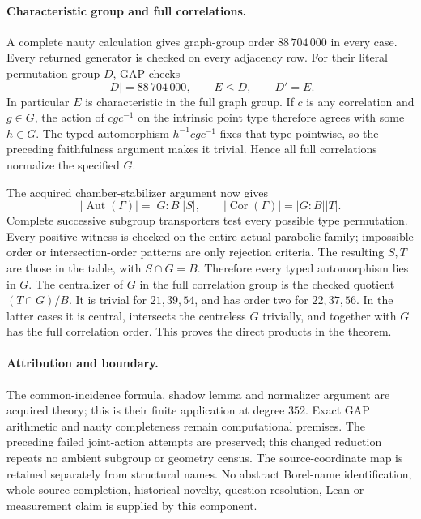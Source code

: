 \documentclass[11pt]{article}
\newcommand{\Aut}{\operatorname{Aut}}\newcommand{\Cor}{\operatorname{Cor}}
\begin{document}
\paragraph{Characteristic group and full correlations.}
A complete nauty calculation gives graph-group order $88\,704\,000$
in every case. Every returned generator is checked on every adjacency
row. For their literal permutation group $D$, GAP checks
\[
             |D|=88\,704\,000,\qquad E\leq D,\qquad D'=E.
\]
In particular $E$ is characteristic in the full graph group.
If $c$ is any correlation and $g\in G$, the action of $cgc^{-1}$ on
the intrinsic point type therefore agrees with some $h\in G$.
The typed automorphism $h^{-1}cgc^{-1}$ fixes that type pointwise,
so the preceding faithfulness argument makes it trivial. Hence
all full correlations normalize the specified $G$.

The acquired chamber-stabilizer argument now gives
\[
 |\Aut(\Gamma)|=|G:B||S|,\qquad
 |\Cor(\Gamma)|=|G:B||T|.
\]
Complete successive subgroup transporters test every possible type
permutation. Every positive witness is checked on the entire actual
parabolic family; impossible order or intersection-order patterns are
only rejection criteria. The resulting $S,T$ are those in the table,
with $S\cap G=B$. Therefore every typed automorphism lies in $G$.
The centralizer of $G$ in the full correlation group is the checked
quotient $(T\cap G)/B$. It is trivial for $21,39,54$, and has order
two for $22,37,56$. In the latter cases it is central, intersects the
centreless $G$ trivially, and together with $G$ has the full correlation
order. This proves the direct products in the theorem.

\paragraph{Attribution and boundary.}
The common-incidence formula, shadow lemma and normalizer argument
are acquired theory; this is their finite application at degree $352$.
Exact GAP arithmetic and nauty completeness remain computational
premises. The preceding failed joint-action attempts are preserved;
this changed reduction repeats no ambient subgroup or geometry census.
The source-coordinate map is retained separately from structural names.
No abstract Borel-name identification, whole-source completion,
historical novelty, question resolution, Lean or measurement claim
is supplied by this component.
\end{document}
